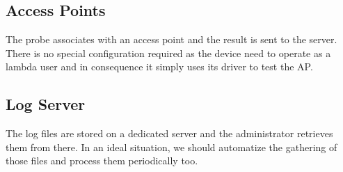 \subsection{Access Points}
The probe associates with an access point and the result is sent to the server. There is no special configuration required as the device need to operate as a lambda user and in consequence it simply uses its driver to test the AP. 

\subsection{Log Server} 
The log files are stored on a dedicated server and the administrator retrieves them from there. In an ideal situation, we should automatize the gathering of those files and process them periodically too.
